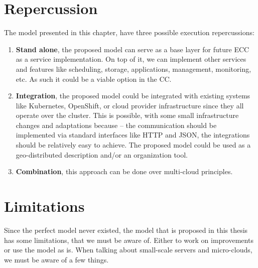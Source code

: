 \section{Repercussion}\label{sec:repercussion}
%
The model presented in this chapter, have three possible execution repercussions:

\begin{enumerate}[start=1,label={(\bfseries \arabic*)}]
	\item \textbf{Stand alone}, the proposed model can serve as a base layer for future ECC as a service implementation. On top of it, we can implement other services and features like scheduling, storage, applications, management, monitoring, etc. As such it could be a viable option in the CC.
	\item \textbf{Integration}, the proposed model could be integrated with existing systems like Kubernetes, OpenShift, or cloud provider infrastructure since they all operate over the cluster. This is possible, with some small infrastructure changes and adaptations because -- the communication should be implemented via standard interfaces like HTTP and JSON, the integrations should be relatively easy to achieve. The proposed model could be used as a geo-distributed description and/or an organization tool.
	\item \textbf{Combination}, this approach can be done over multi-cloud principles.
\end{enumerate} 
%
%
\section{Limitations}\label{sec:limitations}
%
Since the perfect model never existed, the model that is proposed in this thesis has some limitations, that we must be aware of. Either to work on improvements or use the model as is. When talking about small-scale servers and micro-clouds, we must be aware of a few things.


